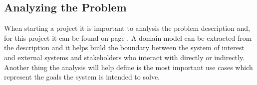 \subsection{Analyzing the Problem}
When starting a project it is important to analysis the problem description and, for this project it can be found on page \pageref{sc:problemdescription}. A domain model can be extracted from the description and it helps build the boundary between the system of interest and external systems and stakeholders who interact with directly or indirectly. 
Another thing the analysis will help define is the most important use cases which represent the goals the system is intended to solve.